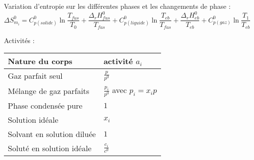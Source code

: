 \documentclass[12pt,a4paper] {article}
\begin{document}
Variation d'entropie sur les différentes phases et les changements de phase :
\[ \Delta S_{m_i}^0 = C_{p(solide)}^0\ln\frac{T_{fus}}{T_0} + \frac{\Delta_r H_{fus}^0}{T_{fus}} + C_{p(liquide)}^0\ln\frac{T_{eb}}{T_{fus}} + \frac{\Delta_r H_{eb}^0}{T_{eb}} + C_{p(gaz)}^0\ln\frac{T_1}{T_{eb}} \]

Activités : \\
\begin{center}\begin{tabular}{|l|l|} \hline
    \bf{Nature du corps} & \bf{activité $a_i$} \\ \hline
    Gaz parfait seul & $\frac{p}{p^0}$ \\ \hline
    Mélange de gaz parfaits & $\frac{p_i}{p^0}$ avec $p_i = x_ip$ \\ \hline
    Phase condensée pure & $1$ \\ \hline
    Solution idéale & $x_i$ \\ \hline
    Solvant en solution diluée & $1$ \\ \hline
    Soluté en solution idéale & $\frac{c_i}{c^0}$ \\ \hline
\end{tabular}\end{center}

\end{document}
